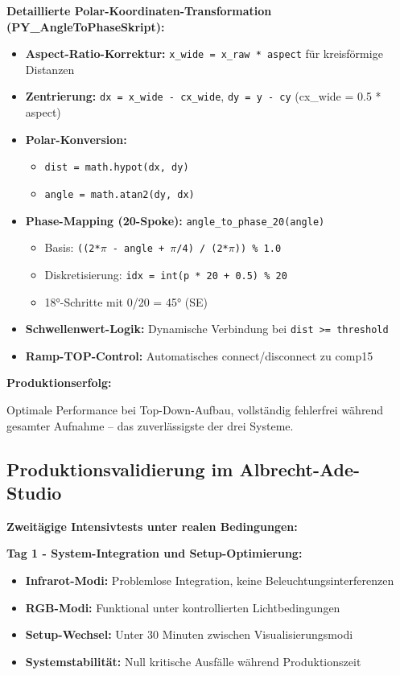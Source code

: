 \textbf{Detaillierte Polar-Koordinaten-Transformation (PY\_AngleToPhaseSkript):}
\begin{itemize}
    \item \textbf{Aspect-Ratio-Korrektur:} \texttt{x\_wide = x\_raw * aspect} für kreisförmige Distanzen
    \item \textbf{Zentrierung:} \texttt{dx = x\_wide - cx\_wide}, \texttt{dy = y - cy} (cx\_wide = 0.5 * aspect)
    \item \textbf{Polar-Konversion:} 
    \begin{itemize}
        \item \texttt{dist = math.hypot(dx, dy)}
        \item \texttt{angle = math.atan2(dy, dx)}
    \end{itemize}
    \item \textbf{Phase-Mapping (20-Spoke):} \texttt{angle\_to\_phase\_20(angle)}
    \begin{itemize}
        \item Basis: \texttt{((2*$\pi$ - angle + $\pi$/4) / (2*$\pi$)) \% 1.0}
        \item Diskretisierung: \texttt{idx = int(p * 20 + 0.5) \% 20}
        \item 18°-Schritte mit 0/20 = 45° (SE)
    \end{itemize}
    \item \textbf{Schwellenwert-Logik:} Dynamische Verbindung bei \texttt{dist >= threshold}
    \item \textbf{Ramp-TOP-Control:} Automatisches connect/disconnect zu comp15
\end{itemize}

\textbf{Produktionserfolg:} \raggedright Optimale Performance bei Top-Down-Aufbau, vollständig fehlerfrei während gesamter Aufnahme – das zuverlässigste der drei Systeme.

\subsection{Produktionsvalidierung im Albrecht-Ade-Studio}

\textbf{Zweitägige Intensivtests unter realen Bedingungen:}

\textbf{Tag 1 - System-Integration und Setup-Optimierung:}
\begin{itemize}
    \item \textbf{Infrarot-Modi:} Problemlose Integration, keine Beleuchtungsinterferenzen
    \item \textbf{RGB-Modi:} Funktional unter kontrollierten Lichtbedingungen
    \item \textbf{Setup-Wechsel:} Unter 30 Minuten zwischen Visualisierungsmodi
    \item \textbf{Systemstabilität:} Null kritische Ausfälle während Produktionszeit
\end{itemize}

